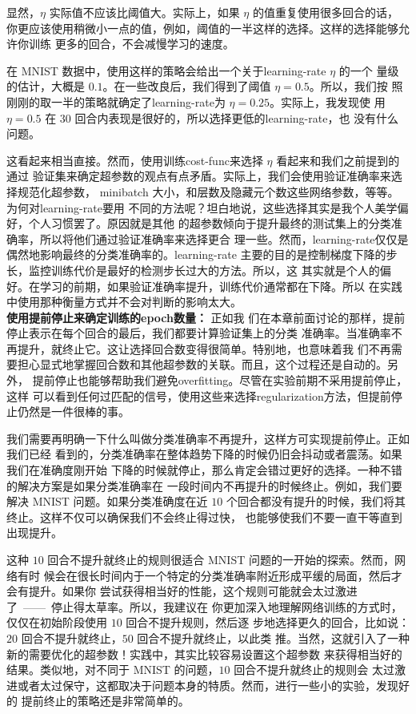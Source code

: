 显然，$\eta$ 实际值不应该比阈值大。实际上，如果 $\eta$ 的值重复使用很多回合的话，
你更应该使用稍微小一点的值，例如，阈值的一半这样的选择。这样的选择能够允许你训练
更多的回合，不会减慢学习的速度。

在 MNIST 数据中，使用这样的策略会给出一个关于\gls*{learning-rate} $\eta$ 的一个
量级的估计，大概是 $0.1$。在一些改良后，我们得到了阈值 $\eta=0.5$。所以，我们按
照刚刚的取一半的策略就确定了\gls*{learning-rate}为 $\eta=0.25$。实际上，我发现使
用 $\eta=0.5$ 在 $30$ 回合内表现是很好的，所以选择更低的\gls*{learning-rate}，也
没有什么问题。

这看起来相当直接。然而，使用训练\gls*{cost-func}来选择 $\eta$ 看起来和我们之前提到的通过
验证集来确定超参数的观点有点矛盾。实际上，我们会使用验证准确率来选择规范化超参数，
minibatch 大小，和层数及隐藏元个数这些网络参数，等等。为何对\gls*{learning-rate}要用
不同的方法呢？坦白地说，这些选择其实是我个人美学偏好，个人习惯罢了。原因就是其他
的超参数倾向于提升最终的测试集上的分类准确率，所以将他们通过验证准确率来选择更合
理一些。然而，\gls*{learning-rate}仅仅是偶然地影响最终的分类准确率的。\gls*{learning-rate}%
主要的目的是控制梯度下降的步长，监控训练代价是最好的检测步长过大的方法。所以，这
其实就是个人的偏好。在学习的前期，如果验证准确率提升，训练代价通常都在下降。所以
在实践中使用那种衡量方式并不会对判断的影响太大。\\

\textbf{使用提前停止\label{early_stopping}来确定训练的\gls*{epoch}数量：} 正如我
们在本章前面讨论的那样，提前停止表示在每个回合的最后，我们都要计算验证集上的分类
准确率。当准确率不再提升，就终止它。这让选择回合数变得很简单。特别地，也意味着我
们不再需要担心显式地掌握回合数和其他超参数的关联。而且，这个过程还是自动的。另外，
提前停止也能够帮助我们避免\gls*{overfitting}。尽管在实验前期不采用提前停止，这样
可以看到任何过匹配的信号，使用这些来选择\gls*{regularization}方法，但提前停止仍然是一件很棒的事。

我们需要再明确一下什么叫做分类准确率不再提升，这样方可实现提前停止。正如我们已经
看到的，分类准确率在整体趋势下降的时候仍旧会抖动或者震荡。如果我们在准确度刚开始
下降的时候就停止，那么肯定会错过更好的选择。一种不错的解决方案是如果分类准确率在
一段时间内不再提升的时候终止。例如，我们要解决 MNIST 问题。如果分类准确度在近
$10$ 个回合都没有提升的时候，我们将其终止。这样不仅可以确保我们不会终止得过快，
也能够使我们不要一直干等直到出现提升。

这种 $10$ 回合不提升就终止的规则很适合 MNIST 问题的一开始的探索。然而，网络有时
候会在很长时间内于一个特定的分类准确率附近形成平缓的局面，然后才会有提升。如果你
尝试获得相当好的性能，这个规则可能就会太过激进了~——~停止得太草率。所以，我建议在
你更加深入地理解网络训练的方式时，仅仅在初始阶段使用 $10$ 回合不提升规则，然后逐
步地选择更久的回合，比如说：$20$ 回合不提升就终止，$50$ 回合不提升就终止，以此类
推。当然，这就引入了一种新的需要优化的超参数！实践中，其实比较容易设置这个超参数
来获得相当好的结果。类似地，对不同于 MNIST 的问题，$10$ 回合不提升就终止的规则会
太过激进或者太过保守，这都取决于问题本身的特质。然而，进行一些小的实验，发现好的
提前终止的策略还是非常简单的。

